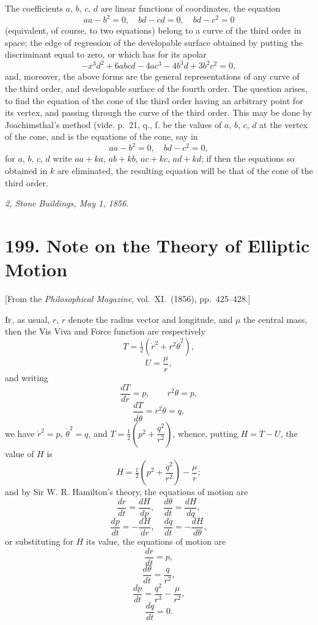 \documentclass[11pt,a4paper]{book}
\begin{document}
\medskip


\medskip

The coefficients $a$, $b$, $c$, $d$ are linear functions of coordinates, the equation
\[
aa-b^2 = 0,\quad bd - cd = 0,\quad bd - c^2 = 0
\]
(equivalent, of course, to two equations) belong to a curve of the third order in space;
the edge of regression of the developable surface obtained by putting the discriminant
equal to zero, or which has for its apolar
\[
-x^3d^2 + 6abcd - 4ac^3 - 4b^3d + 3b^2c^2 = 0,
\]
and, moreover, the above forms are the general representations of any curve of the
third order, and developable surface of the fourth order. The question arises, to find
the equation of the cone of the third order having an arbitrary point for its vertex,
and passing through the curve of the third order. This may be done by Joachimsthal's
method (vide. p.~21, q., f. be the values of $a$, $b$, $c$, $d$ at the vertex of the cone, and is
the equations of the cone, say in
\[
aa - b^2 = 0,\quad bd - c^2 = 0,
\]
for $a$, $b$, $c$, $d$ write $aa + ka$, $ab + kb$, $ac + kc$, $ad + kd$; if then the equations so obtained
in $k$ are eliminated, the resulting equation will be that of the cone of the third order.

\bigskip

\noindent\textit{2, Stone Buildings, May 1, 1856.}

\newpage


\section*{199. Note on the Theory of Elliptic Motion}

\begin{center}
[From the \textit{Philosophical Magazine}, vol.~XI.~(1856), pp.~425--428.]
\end{center}

\bigskip

I\textsc{f}, as usual, $r$, $\dot{r}$ denote the radius vector and longitude, and $\mu$ the central mass,
then the Vis Viva and Force function are respectively
\[
T = \tfrac{1}{2}(\dot{r}^2 + r^2\dot{\theta}^2),
\]
\[
U = \frac{\mu}{r},
\]
and writing
\[
\frac{dT}{d\dot{r}} = p,\qquad r^2\dot{\theta} = p,
\]
\[
\frac{dT}{d\dot{\theta}} = r^2\dot{\theta} = q,
\]
we have $\dot{r}^2 = p$, $\dot{\theta}^2 = q$, and $T = \tfrac{1}{2}\left(p^2 + \dfrac{q^2}{r^2}\right)$, whence, putting $H = T - U$, the value of
$H$ is
\[
H = \tfrac{1}{2}\left(p^2 + \frac{q^2}{r^2}\right) - \frac{\mu}{r};
\]
and by Sir W. R. Hamilton's theory, the equations of motion are
\[
\frac{dr}{dt} = \frac{dH}{dp},\quad \frac{d\theta}{dt} = \frac{dH}{dq},
\]
\[
\frac{dp}{dt} = -\frac{dH}{dr},\quad \frac{dq}{dt} = -\frac{dH}{d\theta},
\]
or substituting for $H$ its value, the equations of motion are
\[
\frac{dr}{dt} = p,
\]
\[
\frac{d\theta}{dt} = \frac{q}{r^2},
\]
\[
\frac{dp}{dt} = \frac{q^2}{r^3} - \frac{\mu}{r^2},
\]
\[
\frac{dq}{dt} = 0.
\]
\end{document}

